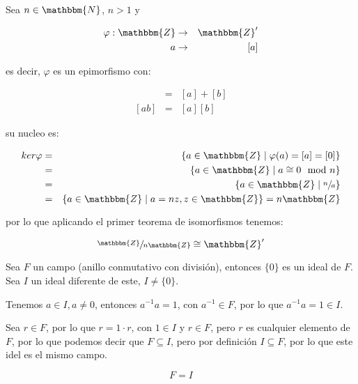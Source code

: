         \begin{ejemplo}
            Sea $n \in \mathbbm{N}$, $n > 1$ y

            \begin{eqnarray*}
                \varphi: \mathbbm{Z} & \to & \mathbbm{Z}' \\
                a & \to & [a]
            \end{eqnarray*}

            es decir, $\varphi$ es un epimorfismo con:

            \begin{eqnarray*}
                [a+b] & = & [a] + [b] \\[2pt]
                [ab] & = & [a][b]
            \end{eqnarray*}

            su nucleo es:

            \begin{eqnarray*}
                ker{\varphi} & = & \left\{ a \in \mathbbm{Z} \mid \varphi(a) = [a] = [0] \right\} \\
                & = & \left\{ a \in \mathbbm{Z} \mid a \cong 0 \mod{n} \right\} \\
                & = & \left\{ a \in \mathbbm{Z} \mid \sfrac{n}{a} \right\} \\
                & = & \left\{ a \in \mathbbm{Z} \mid a = n z, z\in \mathbbm{Z} \right\} = n \mathbbm{Z}
            \end{eqnarray*}

            por lo que aplicando el primer teorema de isomorfismos tenemos:

            \begin{equation*}
                \sfrac{\mathbbm{Z}}{n \mathbbm{Z}} \cong \mathbbm{Z}'
            \end{equation*}
        \end{ejemplo}

        \begin{ejemplo}
            Sea $F$ un campo (anillo conmutativo con división), entonces $\{0\}$ es un ideal de $F$. Sea $I$ un ideal diferente de este, $I \ne \{ 0 \}$.

            Tenemos $a \in I, a \ne 0$, entonces $a^{-1} a = 1$, con $a^{-1} \in F$, por lo que $a^{-1} a = 1 \in I$.

            Sea $r \in F$, por lo que $r = 1 \cdot r$, con $1 \in I$ y $r \in F$, pero $r$ es cualquier elemento de $F$, por lo que podemos decir que $F \subseteq I$, pero por definición $I \subseteq F$, por lo que este idel es el mismo campo.

            \begin{equation*}
                F = I
            \end{equation*}
        \end{ejemplo}

